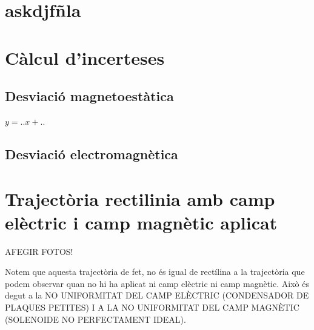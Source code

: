 \documentclass[11pt]{article}
\begin{document}
\section{askdjfñla}

\section{Càlcul d'incerteses}\label{sec: incerteses}
\subsection{Desviació magnetoestàtica\label{sec: inc_desv_mag}}
$y=..x+..$

\subsection{Desviació electromagnètica}\label{sec: inc_desv_em}

\section{Trajectòria rectilinia amb camp elèctric i camp magnètic aplicat}\label{sec: traj_no_rect}

AFEGIR FOTOS!

Notem que aquesta trajectòria de fet, no és igual de rectílina a la trajectòria que podem observar quan no hi ha aplicat ni camp elèctric ni camp magnètic. Això és degut a la NO UNIFORMITAT DEL CAMP ELÈCTRIC (CONDENSADOR DE PLAQUES PETITES) I A LA NO UNIFORMITAT DEL CAMP MAGNÈTIC (SOLENOIDE NO PERFECTAMENT IDEAL).
\end{document}
